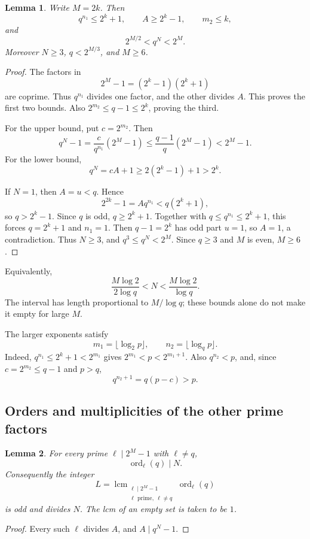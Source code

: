 \documentclass[11pt]{article}
\newtheorem{lemma}{Lemma}
\begin{document}
\begin{lemma}\label{lem:bounds}
Write $M=2k$. Then
\[
q^{n_1}\leq2^k+1,\qquad A\geq2^k-1,\qquad m_2\leq k,
\]
and
\[
\boxed{2^{M/2}<q^N<2^M.}
\]
Moreover $N\geq3$, $q<2^{M/3}$, and $M\geq6$.
\end{lemma}
\begin{proof}
The factors in
\[
2^M-1=(2^k-1)(2^k+1)
\]
are coprime. Thus $q^{n_1}$ divides one factor, and the other divides
$A$. This proves the first two bounds. Also
$2^{m_2}\leq q-1\leq2^k$, proving the third.

For the upper bound, put $c=2^{m_2}$. Then
\[
q^N-1=\frac{c}{q^{n_1}}(2^M-1)
 \leq\frac{q-1}{q}(2^M-1)<2^M-1.
\]
For the lower bound,
\[
q^N=cA+1\geq2(2^k-1)+1>2^k.
\]

If $N=1$, then $A=u<q$. Hence
\[
2^{2k}-1=Aq^{n_1}<q(2^k+1),
\]
so $q>2^k-1$. Since $q$ is odd, $q\geq2^k+1$.
Together with $q\leq q^{n_1}\leq2^k+1$, this forces
$q=2^k+1$ and $n_1=1$. Then $q-1=2^k$ has odd part $u=1$,
so $A=1$, a contradiction.
Thus $N\geq3$, and $q^3\leq q^N<2^M$.
Since $q\geq3$ and $M$ is even, $M\geq6$.
\end{proof}

Equivalently,
\begin{equation}\label{eq:window}
\frac{M\log2}{2\log q}<N<\frac{M\log2}{\log q}.
\end{equation}
The interval has length proportional to $M/\log q$; these bounds alone
do not make it empty for large $M$.

The larger exponents satisfy
\[
m_1=\lfloor\log_2p\rfloor,\qquad
n_2=\lfloor\log_qp\rfloor.
\]
Indeed, $q^{n_1}\leq2^k+1<2^{m_1}$ gives
$2^{m_1}<p<2^{m_1+1}$. Also $q^{n_2}<p$, and, since
$c=2^{m_2}\leq q-1$ and $p>q$,
\[
q^{n_2+1}=q(p-c)>p.
\]

\subsection{Orders and multiplicities of the other prime factors}

\begin{lemma}\label{lem:orders}
For every prime $\ell\mid2^M-1$ with $\ell\neq q$,
\[
\operatorname{ord}_\ell(q)\mid N.
\]
Consequently the integer
\[
L=\operatorname{lcm}_{\substack{\ell\mid2^M-1\\
\ell\text{ prime},\ \ell\neq q}}
\operatorname{ord}_\ell(q)
\]
is odd and divides $N$. The lcm of an empty set is taken to be $1$.
\end{lemma}
\begin{proof}
Every such $\ell$ divides $A$, and $A\mid q^N-1$.
\end{proof}
\end{document}
